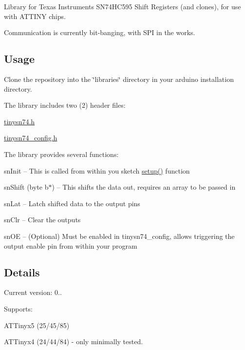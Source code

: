 Library for Texas Instruments S\+N74\+H\+C595 Shift Registers (and clones), for use with A\+T\+T\+I\+NY chips.

Communication is currently bit-\/banging, with S\+PI in the works.

\subsection*{Usage}

Clone the repository into the \char`\"{}libraries\char`\"{} directory in your arduino installation directory.

The library includes two (2) header files\+:
\begin{DoxyItemize}
\item \hyperlink{tinysn74_8h}{tinysn74.\+h}
\item \hyperlink{tinysn74__config_8h}{tinysn74\+\_\+config.\+h}
\end{DoxyItemize}

The library provides several functions\+:
\begin{DoxyItemize}
\item sn\+Init -- This is called from within you sketch \hyperlink{SN74__Count_8ino_a4fc01d736fe50cf5b977f755b675f11d}{setup()} function
\item sn\+Shift (byte b$\ast$) -- This shifts the data out, requires an array to be passed in
\item sn\+Lat -- Latch shifted data to the output pins
\item sn\+Clr -- Clear the outputs
\item sn\+OE -- (Optional) Must be enabled in tinysn74\+\_\+config, allows triggering the output enable pin from within your program
\end{DoxyItemize}

\subsection*{Details}


\begin{DoxyItemize}
\item Current version\+: 0..
\item Supports\+:
\begin{DoxyItemize}
\item A\+T\+Tinyx5 (25/45/85)
\item A\+T\+Tinyx4 (24/44/84) -\/ only minimally tested.
\end{DoxyItemize}
\end{DoxyItemize}

